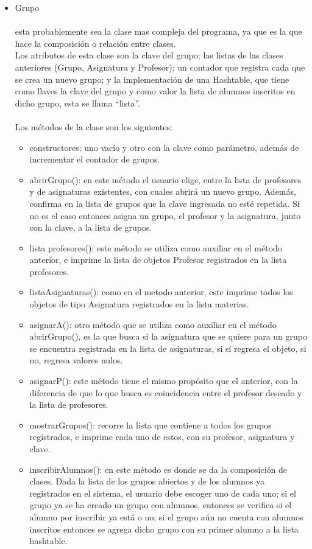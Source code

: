 \documentclass[12pt]{report}
\begin{document}
\begin{itemize}
\item Grupo  \\ \\
esta probablemente sea la clase mas compleja del programa, ya que es la que hace la composición o relación entre clases.\\
Los atributos de esta clase son la clave del grupo; las listas de las clases anteriores (Grupo, Asignatura y Profesor); un contador que registra cada que se crea un nuevo grupo; y la implementación de una Hashtable, que tiene como llaves la clave del grupo y como valor la lista de alumnos inscritos en dicho grupo, esta se llama “lista”.\\
\\Los métodos de la clase son los siguientes:
\begin{itemize}
\item constructores: uno vacío y otro con la clave como parámetro, además de incrementar el contador de grupos.
\item abrirGrupo(): en este método el usuario elige, entre la lista de profesores y de asignaturas existentes, con cuales abrirá un nuevo grupo. Además, confirma en la lista de grupos que la clave ingresada no esté repetida. Si no es el caso entonces asigna un grupo, el profesor y la asignatura, junto con la clave, a la lista de grupos.
\item lista profesores(): este método se utiliza como auxiliar en el método anterior, e imprime la lista de objetos Profesor registrados en la lista profesores.
\item listaAsignaturas(): como en el metodo anterior, este imprime todos los objetos de tipo Asignatura registrados en la lista materias.
\item asignarA(): otro método que se utiliza como auxiliar en el método abrirGrupo(), es la que busca si la asignatura que se quiere para un grupo se encuentra registrada en la lista de asignaturas, si sí regresa el objeto, si no, regresa valores nulos.
\item asignarP(): este método tiene el mismo propósito que el anterior, con la diferencia de que lo que busca es coincidencia entre el profesor deseado y la lista de profesores.
\item mostrarGrupos(): recorre la lista que contiene a todos los grupos registrados, e imprime cada uno de estos, con su profesor, asignatura y clave.
\item inscribirAlumnos(): en este método es donde se da la composición de clases. Dada la lista de los grupos abiertos y de los alumnos ya registrados en el sistema, el usuario debe escoger uno de cada uno; si el grupo ya se ha creado un grupo con alumnos, entonces se verifica si el alumno por inscribir ya está o no; si el grupo aún no cuenta con alumnos inscritos entonces se agrega dicho grupo con su primer alumno a la lista hashtable.

\end{itemize}
\end{itemize}
\end{document}
